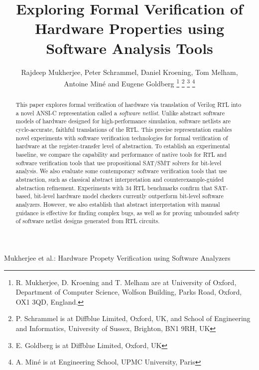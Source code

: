 \documentclass[journal]{IEEEtran}
\theoremstyle{definition}
\begin{document}
\title{Exploring Formal Verification of Hardware Properties using Software Analysis Tools}

\author{Rajdeep Mukherjee, 
        Peter Schrammel,
        Daniel Kroening, 
        Tom Melham, \\
        Antoine Min{\'e} and
        Eugene Goldberg
        \thanks{R. Mukherjee, D. Kroening and T. Melham are at 
                University of Oxford, Department of Computer Science,
                Wolfson Building, Parks Road,
                Oxford, OX1 3QD, England.}
        \thanks{P. Schrammel is at  Diffblue Limited, Oxford, UK, and
                School of Engineering and Informatics,
                University of Sussex, Brighton, BN1 9RH, UK}
        \thanks{E. Goldberg is at Diffblue Limited, Oxford, UK}
        \thanks{A. Min{\'e} is at Engineering School, UPMC University, Paris}}
%
         {Mukherjee et al.: Hardware Propety Verification using Software Analyzers}

\maketitle

\begin{abstract}
This paper explores formal verification of hardware via translation of
Verilog RTL into a novel ANSI-C representation called a \emph{software
netlist}.  Unlike abstract software models of hardware designed for
high-performance simulation, software netlists are cycle-accurate, faithful
translations of the RTL.  This precise representation enables novel
experiments with software verification technologies for formal verification
of hardware at the register-transfer level of abstraction.  To establish an
experimental baseline, we compare the capability and performance of native
tools for RTL and software verification tools that use propositional SAT/SMT
solvers for bit-level analysis.  We also evaluate some contemporary software
verification tools that use abstraction, such as classical abstract
interpretation and counterexample-guided abstraction refinement. 
Experiments with 34 RTL benchmarks confirm that SAT-based, bit-level
hardware model checkers currently outperform bit-level software analyzers. 
However, we also establish that abstract interpretation with manual guidance
is effective for finding complex bugs, as well as for proving unbounded safety
of software netlist designs generated from RTL circuits.
\end{abstract}
\end{document}
